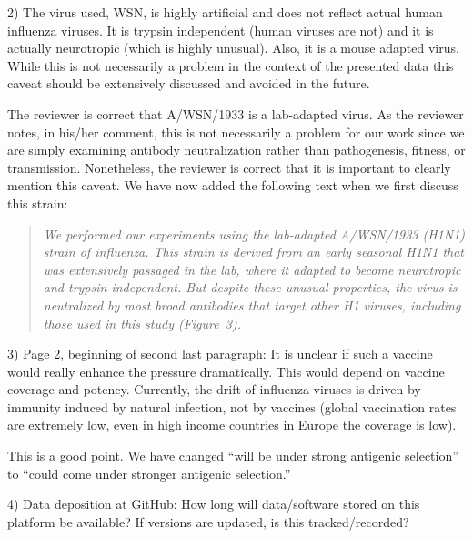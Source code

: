 \documentclass[11pt, oneside]{article}   	%
\begin{document}
2) The virus used, WSN, is highly artificial and does not reflect actual human influenza viruses. It is trypsin independent (human viruses are not) and it is actually neurotropic (which is highly unusual). Also, it is a mouse adapted virus. While this is not necessarily a problem in the context of the presented data this caveat should be extensively discussed and avoided in the future.

{\color{black}
The reviewer is correct that A/WSN/1933 is a lab-adapted virus.
As the reviewer notes, in his/her comment, this is not necessarily a problem for our work since we are simply examining antibody neutralization rather than pathogenesis, fitness, or transmission. 
Nonetheless, the reviewer is correct that it is important to clearly mention this caveat. 
We have now added the following text when we first discuss this strain:

\begin{quote}
\textsl{We performed our experiments using the lab-adapted A/WSN/1933 (H1N1) strain of influenza.
This strain is derived from an early seasonal H1N1 that was extensively passaged in the lab, where it adapted to become neurotropic and trypsin independent.
But despite these unusual properties, the virus is neutralized by most broad antibodies that target other H1 viruses, including those used in this study (Figure~3).}
\end{quote}
}

3) Page 2, beginning of second last paragraph: It is unclear if such a vaccine would really enhance the pressure dramatically. This would depend on vaccine coverage and potency. Currently, the drift of influenza viruses is driven by immunity induced by natural infection, not by vaccines (global vaccination rates are extremely low, even in high income countries in Europe the coverage is low).

{\color{black}
This is a good point. We have changed ``will be under strong antigenic selection'' to ``could come under stronger antigenic selection.''
}

4) Data deposition at GitHub: How long will data/software stored on this platform be available? If versions are updated, is this tracked/recorded? 
\end{document}

